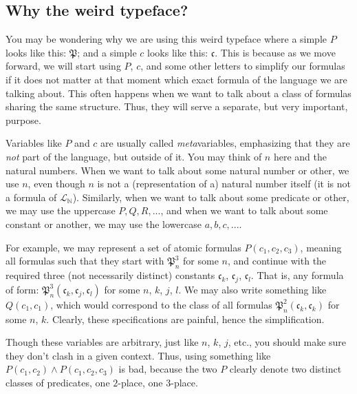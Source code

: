 \subsection{Why the weird typeface?}

You may be wondering why we are using this weird typeface where a simple $P$ looks like this: $\mathfrak{P}$; and a simple $c$ looks like this: $\mathfrak{c}$. This is because as we move forward, we will start using $P$, $c$, and some other letters to simplify our formulas if it does not matter at that moment which exact formula of the language we are talking about. This often happens when we want to talk about a class of formulas sharing the same structure. Thus, they will serve a separate, but very important, purpose. 



Variables like $P$ and $c$ are usually called \textit{meta}variables, emphasizing that they are \textit{not} part of the language, but outside of it. You may think of $n$ here and the natural numbers. When we want to talk about some natural number or other, we use $n$, even though $n$ is not a (representation of a) natural number itself (it is not a formula of $\mathcal{L}_\mathbb{N}$). Similarly, when we want to talk about some predicate or other, we may use the uppercase $P, Q, R, ...$, and when we want to talk about some constant or another, we may use the lowercase $a, b, c, ...$. 

For example, we may represent a set of atomic formulas $P(c_1, c_2, c_3)$, meaning all formulas such that they start with $\mathfrak{P}^3_n$ for some $n$, and continue with the required three (not necessarily distinct) constants $\mathfrak{c}_k$, $\mathfrak{c}_j$, $\mathfrak{c}_l$. That is, any formula of form: $\mathfrak{P}^3_n(\mathfrak{c}_k, \mathfrak{c}_j, \mathfrak{c}_l)$ for some $n$, $k$, $j$, $l$. We may also write something like $Q(c_1, c_1)$, which would correspond to the class of all formulas $\mathfrak{P}^2_n(\mathfrak{c}_k, \mathfrak{c}_k)$ for some $n$, $k$. Clearly, these specifications are painful, hence the simplification. 

Though these variables are arbitrary, just like $n$, $k$, $j$, etc., you should make sure they don't clash in a given context. Thus, using something like $P(c_1, c_2) \wedge P(c_1, c_2, c_3)$ is bad, because the two $P$ clearly denote two distinct classes of predicates, one $2$-place, one $3$-place. 

